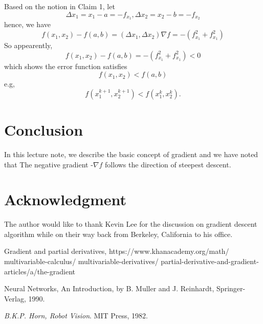 \documentclass[conference]{IEEEtran}
\begin{document}
Based on the notion in Claim 1, let
\begin{equation}
\Delta x_1 = x_1 - a = -f_{x_1}  , 
\Delta x_2 = x_2 - b = -f_{x_2} 
\end{equation}
hence, we have 
\begin{equation}
f(x_1,x_2) - f(a,b)
=(\Delta x_1, \Delta x_2) \nabla f
=-(f_{x_1}^2 + f_{x_1}^2) 
\end{equation}
So appearently, 
\begin{equation}
f(x_1,x_2) - f(a,b) 
=-(f_{x_1}^2 + f_{x_1}^2) < 0  
\end{equation}
which shows the error function satisfies 
\begin{equation}
f(x_1,x_2) < f(a,b)   
\end{equation}
e.g, 
\begin{equation}
f(x_1^{k+1}, x_2^{k+1}) < f(x_1^k, x_2^k). 
\end{equation}

\section{Conclusion}
In this lecture note,  we describe the basic concept of 
gradient and we have noted that 
The negative gradient -$\nabla f$ follows
the direction of steepest descent. 

\section*{Acknowledgment}
The author would like to thank Kevin Lee for the 
discussion on gradient descent algorithm while on their
way back from Berkeley, California to his office.  
 
\begin{thebibliography}{1}


\bibitem{[1]} Gradient and partial derivatives,  
https://www.khanacademy.org/math/ multivariable-calculus/
multivariable-derivatives/ partial-derivative-and-gradient-
articles/a/the-gradient

\bibitem{[2]} Neural Networks, An Introduction, by 
B. Muller and J. Reinhardt, Springer-Verlag, 1990. 

\textit{B.K.P. Horn, Robot Vision}.  
MIT Press, 1982. 

\end{thebibliography}

\end{document}
